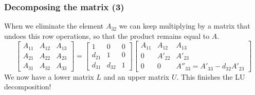 \begin{frame}[fragile]
  \frametitle{Decomposing the matrix (3)}
  When we eliminate the element $A_{32}$ we can keep multiplying by a matrix that undoes this row operations, so that the product remains equal to $A$.
\[ 
\begin{bmatrix}
A_{11} & A_{12} & A_{13}\\ 
A_{21} & A_{22} & A_{23}\\ 
A_{31} & A_{32} & A_{33}
\end{bmatrix} = 
\begin{bmatrix}
1 & 0 & 0 \\
d_{21}& 1 & 0 \\
d_{31} & d_{32} & 1
\end{bmatrix}
\begin{bmatrix}
A_{11} & A_{12} & A_{13}\\ 
0 & A'_{22} & A'_{23} \\ 
0 & 0  & A''_{33} = A'_{33}-d_{32}A'_{23}
\end{bmatrix}
\]\pause
We now have a lower matrix $L$ and an upper matrix $U$. This finishes the LU decomposition! 
\end{frame}

